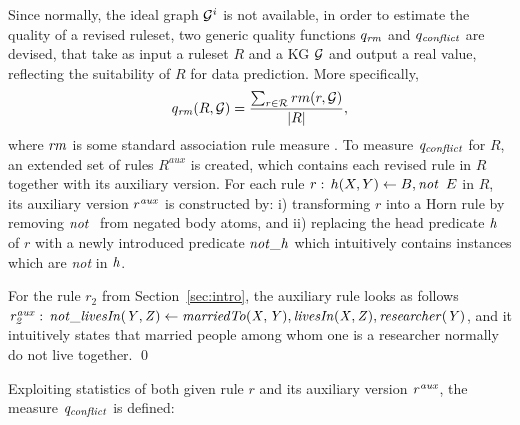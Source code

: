 Since normally, the ideal graph $\mathcal{G}^i$ is not available, in order to estimate the quality of a
revised ruleset, two generic quality functions $q_{\mathit{rm}}$ and
$q_{\mathit{conflict}}$ are devised, that take as input a ruleset $R$ and a KG $\mathcal{G}$ and output a
real value, reflecting the suitability of $R$ for data prediction.  More
specifically, \begin{equation}q_{\mathit{rm}} (R,\mathcal{G})=\dfrac{\sum_{r\in
    \mathcal{R}}rm(r,\mathcal{G})}{|R|}, \end{equation} where $\mathit{rm}$ is some standard
association rule measure \cite{Azevedo2007}. To measure $\mathit{q_{conflict}}$ for
$R$, an extended set of rules $R^{aux}$ is created, which contains each %
revised rule in $R$ %
together with %
its auxiliary version. For each rule $r:\,h(X,Y)\leftarrow B,\mathit{not}~ \,E$ in $R$,
its auxiliary version $r^{\mathit{aux}}$ is constructed by: i) transforming $r$ into a Horn rule by
removing %
$\naf$ from negated body atoms, %
and ii) replacing the head
predicate $\mathit{h}$ of $r$ %
with a newly introduced predicate $\mathit{not\_h}$ which intuitively contains %
instances which are \emph{not} in $\mathit{h}$. 

\begin{example} For the rule $r_2$ from Section~\ref{sec:intro}, the auxiliary rule looks as follows $\mathit{r_2^{aux}:\,not\_livesIn(Y,Z)\leftarrow marriedTo(X,Y),livesIn(X,Z),researcher(Y)}$, and it intuitively states that married people among whom one is a researcher normally do not live together. \qed
\end{example}


Exploiting statistics of both given rule $r$ and its auxiliary version $\mathit{r^{aux}}$, the measure $\mathit{q_{conflict}}$ is defined:

